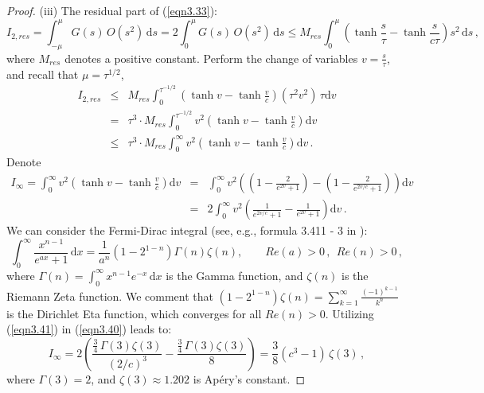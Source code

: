\documentclass[final,hidelinks,onefignum,onetabnum]{siamart251216}
\begin{document}
\begin{proof}
\noindent(iii) The residual part of (\ref{eqn3.33}):
\begin{equation}
I_{2,res}=\int_{-\mu}^{\mu} G(s)\, O(s^2) \, \mathrm{d}s = 2 \int_0^{\mu} G(s)\, O(s^2) \, \mathrm{d}s \le M_{res} \int_0^{\mu} \left( \tanh \frac{s}{\tau} - \tanh \frac{s}{c\tau}\right) s^2 \, \mathrm{d}s \,,
\end{equation}
where $M_{res}$ denotes a positive constant. Perform the change of variables $v = \frac{s}{\tau}$, and recall that $\mu=\tau^{1/2}$,
\begin{eqnarray}
I_{2,res}&\le& M_{res} \int_0^{\tau^{-1/2}} \left( \tanh v - \tanh \frac{v}{c}\right) \left(\tau^2 v^2\right) \, \tau\mathrm{d}v \nonumber \\
&=& \tau^3\cdot M_{res} \int_0^{\tau^{-1/2}} v^2 \left( \tanh v - \tanh \frac{v}{c}\right) \mathrm{d}v \nonumber \\
&\le& \tau^3\cdot M_{res} \int_0^{\infty} v^2 \left( \tanh v - \tanh \frac{v}{c}\right) \mathrm{d}v \,. \label{eqn3.39}
\end{eqnarray}
Denote
\begin{eqnarray}
I_\infty = \int_0^{\infty} v^2 \left( \tanh v - \tanh \frac{v}{c}\right) \mathrm{d}v&= &\int_0^{\infty} v^2 \left(  \left( 1 - \frac{2}{e^{2v} + 1} \right) - \left( 1 - \frac{2}{e^{2v/c} + 1} \right) \right) \mathrm{d}v \nonumber \\
&=& 2 \int_0^{\infty} v^2 \left(  \frac{1}{e^{2v/c} + 1} - \frac{1}{e^{2v} + 1} \right) \mathrm{d}v \,. \label{eqn3.40}
\end{eqnarray}
We can consider the Fermi-Dirac integral (see, e.g., formula 3.411 - 3 in \cite{graryz07}):
\begin{equation} \label{eqn3.41}
\int_0^\infty \frac{x^{n-1}}{e^{ax} + 1}\, \mathrm{d}x = \frac{1}{a^n}(1 - 2^{1-n}) \Gamma(n) \zeta(n), \qquad Re (a) > 0\,,\ \ Re (n) > 0\,,
\end{equation}
where $\Gamma(n)  = \int_0^\infty x^{n-1} e^{-x} \, \mathrm{d}x $ is the Gamma function, and $\zeta(n)$ is the Riemann Zeta function. We comment that $(1 - 2^{1-n}) \zeta(n)= \sum_{k=1}^\infty \frac{(-1)^{k-1}}{k^n}$ is the Dirichlet Eta function, which converges for all $Re(n) > 0$. 
Utilizing (\ref{eqn3.41}) in (\ref{eqn3.40}) leads to: 
\begin{equation} \label{eqn3.42}
I_\infty = 2  \left( \frac{ \frac{3}{4}\,\Gamma(3) \zeta(3)}{(2/c)^3}- \frac{ \frac{3}{4}\,\Gamma(3) \zeta(3)}{8}  \right) =  \frac{3}{8}(c^3 - 1)\, \zeta(3)\,,
\end{equation}
where $\Gamma(3)=2$, and $\zeta(3) \approx 1.202$ is Apéry's constant.


\end{proof}
\end{document}
